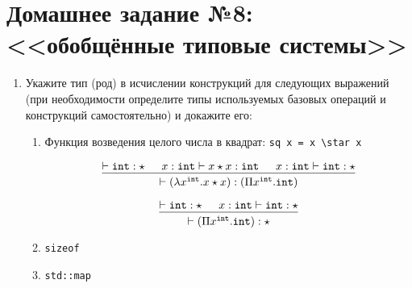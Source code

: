 

\cfoot{}



\section{Домашнее задание №8: <<обобщённые типовые системы>>}
\begin{enumerate}
    \item Укажите тип (род) в исчислении конструкций для следующих выражений (при необходимости определите
          типы используемых базовых операций и конструкций самостоятельно) и докажите его:
          \begin{enumerate}
              \item Функция возведения целого числа в квадрат: \verb!sq x = x \star x!
                    \begin{solution}
                        \[\begin{prooftree}
                                \hypo{\vdash \texttt{int} : \star}
                                \hypo{x : \texttt{int} \vdash x \star x : \texttt{int}}
                                \hypo{x : \texttt{int} \vdash \texttt{int} : \star}
                                \infer3{\vdash (\lambda x^{\texttt{int}}.x \star x) : (\Pi x^{\texttt{int}}.\texttt{int})}
                            \end{prooftree}\]

                        \[\begin{prooftree}
                                \hypo{\vdash \texttt{int} : \star}
                                \hypo{x : \texttt{int} \vdash \texttt{int} : \star}
                                \infer2{\vdash (\Pi x^{\texttt{int}}.\texttt{int}) : \star}
                            \end{prooftree}\]
                    \end{solution}
              \item \verb!sizeof!
              \item \verb!std::map!


\end{enumerate}
\end{enumerate}
